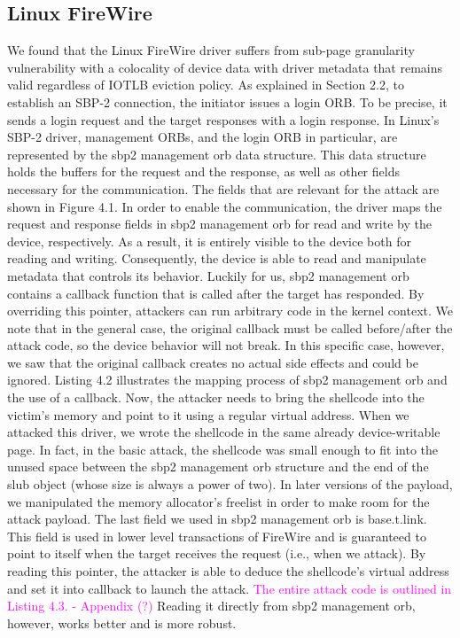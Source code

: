 \subsection{Linux FireWire}
We found that the Linux FireWire driver suffers from sub-page granularity vulnerability with a colocality of device data with driver metadata that remains valid regardless of IOTLB eviction policy. As explained in Section 2.2, to establish an SBP-2 connection, the initiator issues a login ORB. To be precise, it sends a login request and the target responses with a login response. In Linux’s SBP-2 driver, management ORBs, and the login ORB in particular, are represented by the sbp2 management orb data structure. This data structure holds the buffers for the request and the response, as well as other fields necessary for the communication. The fields that are relevant for the attack are shown in Figure 4.1. In order to enable the communication, the driver maps the request and response fields in sbp2 management orb for read and write by the device, respectively. As a result, it is entirely visible to the device both for reading and writing. Consequently, the device is able to read and manipulate metadata that controls its behavior. Luckily for us, sbp2 management orb contains a callback function that is called after the target has responded. By overriding this pointer, attackers can run arbitrary code in the kernel context. We note that in the general case, the original callback must be called before/after the attack code, so the device behavior will not break. In this specific case, however, we saw that the original callback creates no actual side effects and could be ignored. Listing 4.2 illustrates the mapping process of sbp2 management orb and the use of a callback. Now, the attacker needs to bring the shellcode into the victim’s memory and point to it using a regular virtual address. When we attacked this driver, we wrote the shellcode in the same already device-writable page. In fact, in the basic attack, the shellcode was small enough to fit into the unused space between the sbp2 management orb structure and the end of the slub object (whose size is always a power of two). In later versions of the payload, we manipulated the memory allocator’s freelist in order to make room for the attack payload. The last field we used in sbp2 management orb is base.t.link. This field is used in lower level transactions of FireWire and is guaranteed to point to itself when the target receives the request (i.e., when we attack). By reading this pointer, the attacker is able to deduce the shellcode’s virtual address and set it into callback to launch the attack. \textcolor{magenta}{The entire attack code is outlined in Listing 4.3. - Appendix (?) } Reading it directly from sbp2 management orb, however, works better and is more robust.

